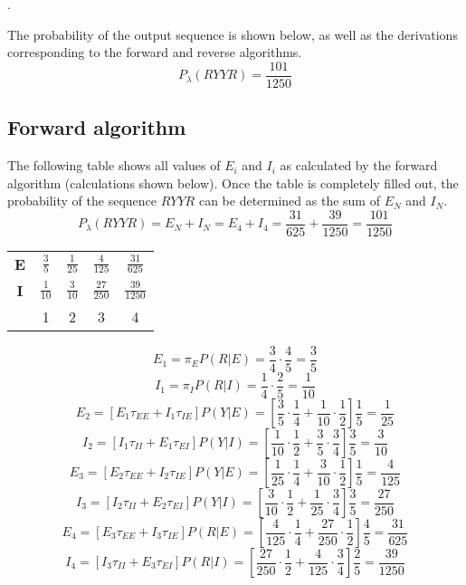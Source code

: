 \documentclass[a4paper, 10pt]{article}
\newcounter{prob_num}
\newcommand{\problem}{\vspace{20pt}\arabic{prob_num}.\stepcounter{prob_num}\par}
\begin{document}
\problem

The probability of the output sequence is shown below, as well as the derivations corresponding to the forward and reverse algorithms.
\[ P_{\lambda}(RYYR) = \frac{101}{1250} \]

\subsection*{Forward algorithm}

The following table shows all values of $E_i$ and $I_i$ as calculated by the forward algorithm (calculations shown below). Once the table is completely filled out, the probability of the sequence $RYYR$ can be determined as the sum of $E_N$ and $I_N$.
\[ P_{\lambda}(RYYR) = E_N + I_N = E_4 + I_4 = \frac{31}{625} + \frac{39}{1250} = \frac{101}{1250} \]

\renewcommand{\arraystretch}{2}
\begin{center}
\begin{tabular}{|c|c c c c|}
  \hline
  \textbf{E} & $\frac{3}{5}$  & $\frac{1}{25}$ & $\frac{4}{125}$  & $\frac{31}{625}$  \\
  \textbf{I} & $\frac{1}{10}$ & $\frac{3}{10}$ & $\frac{27}{250}$ & $\frac{39}{1250}$ \\
  \hline
             & 1 & 2 & 3 & 4 \\
  \hline
\end{tabular}
\end{center}
\renewcommand{\arraystretch}{1}

\[ E_1 = \pi_{E}P(R|E) = \frac{3}{4}\cdot\frac{4}{5} = \frac{3}{5} \]
\[ I_1 = \pi_{I}P(R|I) = \frac{1}{4}\cdot\frac{2}{5} = \frac{1}{10} \]
\[ E_2 = \left[ E_{1}\tau_{EE}+ I_{1}\tau_{IE} \right]P(Y|E) = \left[ \frac{3}{5}\cdot\frac{1}{4} + \frac{1}{10}\cdot\frac{1}{2} \right]\frac{1}{5} = \frac{1}{25} \]
\[ I_2 = \left[ I_{1}\tau_{II}+ E_{1}\tau_{EI} \right]P(Y|I) = \left[ \frac{1}{10}\cdot\frac{1}{2} + \frac{3}{5}\cdot\frac{3}{4} \right]\frac{3}{5} = \frac{3}{10} \]
\[ E_3 = \left[ E_{2}\tau_{EE}+ I_{2}\tau_{IE} \right]P(Y|E) = \left[ \frac{1}{25}\cdot\frac{1}{4} + \frac{3}{10}\cdot\frac{1}{2} \right]\frac{1}{5} = \frac{4}{125} \]
\[ I_3 = \left[ I_{2}\tau_{II}+ E_{2}\tau_{EI} \right]P(Y|I) = \left[ \frac{3}{10}\cdot\frac{1}{2} + \frac{1}{25}\cdot\frac{3}{4} \right]\frac{3}{5} = \frac{27}{250} \]
\[ E_4 = \left[ E_{3}\tau_{EE}+ I_{3}\tau_{IE} \right]P(R|E) = \left[ \frac{4}{125}\cdot\frac{1}{4} + \frac{27}{250}\cdot\frac{1}{2} \right]\frac{4}{5} = \frac{31}{625} \]
\[ I_4 = \left[ I_{3}\tau_{II}+ E_{3}\tau_{EI} \right]P(R|I) = \left[ \frac{27}{250}\cdot\frac{1}{2} + \frac{4}{125}\cdot\frac{3}{4} \right]\frac{2}{5} = \frac{39}{1250} \]
\end{document}
